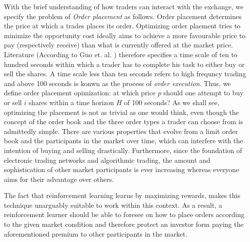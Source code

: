 With the brief understanding of how traders can interact with the exchange, we specify the problem of \textit{Order placement} as follows.
Order placement determines the price at which a trades places its order.
Optimizing order plaement tries to minimize the opportunity cost ideally aims to achieve a more favourable price to pay (respectively receive) than what is currently offered at the market price.
Literature (According to Guo et. al. \cite{guo2013optimal}) therefore specifies a time scale of ten to hundred seconds within which a trader has to complete his task to either buy or sell the shares.
A time scale less than ten seconds refers to high frequncy trading and above 100 seconds is konwn as the process of \textit{order execution}.
Thus, we define order placement opimization: at which price $p$ should one attempt to buy or sell $i$ shares within a time horizon $H$ of 100 seconds?
As we shall see, optimizing the placement is not as trivial as one would think, even though the concept of the order book and the three order types a trader can choose from is admittedly simple.
There are various properties that evolve from a limit order book and the participants in the market over time, which can interfere with the intention of buying and selling drastically.
Furthermore, since the foundation of electronic trading networks and algorithmic trading, the amount and sophistication of other market participants is ever increasing whereas everyone aims for their advantage over others.
%

The fact that reinforcement learning learns by maximizing rewards, makes this technique unarguably suitable to work within this context.
As a result, a reinforcement learner should be able to foresee on how to place orders according to the given market condition and therefore protect an investor form paying the aforementioned premium to other participants in the market.

